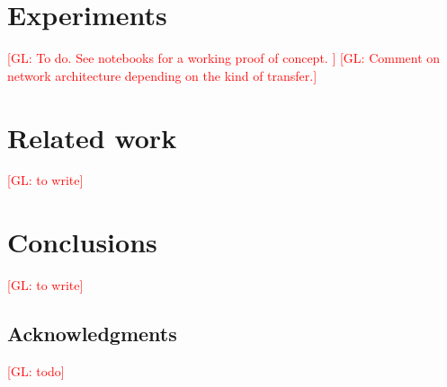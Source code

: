 \documentclass{article}
\newcommand{\glnote}[1]{\textcolor{red}{[GL: #1]}}
\theoremstyle{plain}
\begin{document}
\section{Experiments}

\glnote{To do. See notebooks for a working proof of concept. }
\glnote{Comment on network architecture depending on the kind of transfer.}


\section{Related work}

\glnote{to write}


\section{Conclusions}

\glnote{to write}

\subsection*{Acknowledgments}

\glnote{todo}



\end{document}
